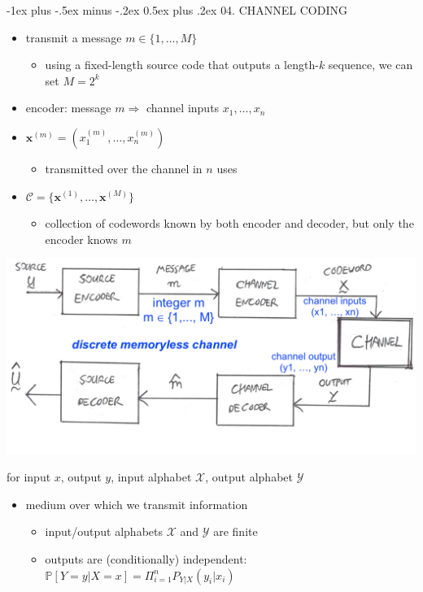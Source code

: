 \documentclass[10pt, landscape]{article}
\makeatletter
\renewcommand{\section}{\@startsection{section}{1}{0mm}%
  {-1ex plus -.5ex minus -.2ex}%
  {0.5ex plus .2ex}%
{\normalfont\large\bfseries}}
\makeatother
\begin{document}
\begin{multicols*}{4}
  \section{04. CHANNEL CODING}

  \begin{itemize}
    \item transmit a message $m \in \{1, \dots, M\}$ 
      \begin{itemize}
        \item using a fixed-length source code that outputs a length-$k$ sequence, we can set $M=2^k$
      \end{itemize}
    \item encoder: message $m \Rightarrow$ channel inputs $x_1, \dots, x_n$
    \item {} $\mathbf{x}^{(m)} = (x_1^{(m)}, \dots, x_n^{(m)})$
      \begin{itemize}
        \item transmitted over the channel in $n$ uses
      \end{itemize}
    \item {} $\mathcal{C} = \{\mathbf{x}^{(1)}, \dots, \mathbf{x}^{(M)}\}$
      \begin{itemize}
        \item collection of codewords known by both encoder and decoder, but only the encoder knows $m$
      \end{itemize}
  \end{itemize}

  \includegraphics[width=0.95\linewidth]{cs3236-full-communication-setup.png} 

  for input $x$, output $y$, input alphabet $\mathcal{X}$, output alphabet $\mathcal{Y}$

  \begin{itemize}
    \item {} medium over which we transmit information
      \begin{itemize}
        \item {} input/output alphabets $\mathcal{X}$ and $\mathcal{Y}$ are finite
        \item {} outputs are (conditionally) independent: $\mathbb{P}[Y=y \vert X=x] = \Pi^n_{i=1} P_{Y \vert X} (y_i \vert x_i)$
      \end{itemize}
  \end{itemize}


\end{multicols*}
\end{document}
